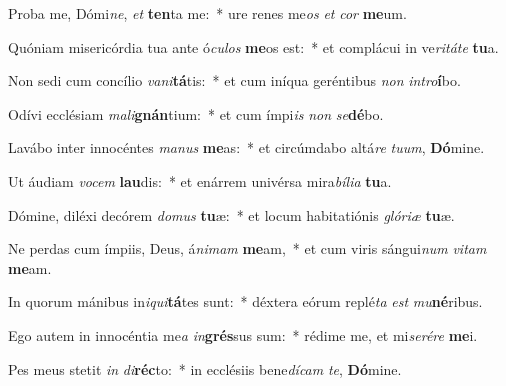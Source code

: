\item Proba me, Dómi\textit{ne}, \textit{et} \textbf{ten}ta me:~* ure renes me\textit{os} \textit{et} \textit{cor} \textbf{me}um.
\item Quóniam misericórdia tua ante ó\textit{cu}\textit{los} \textbf{me}os est:~* et complácui in ve\textit{ri}\textit{tá}\textit{te} \textbf{tu}a.
\item Non sedi cum concílio \textit{va}\textit{ni}\textbf{tá}tis:~* et cum iníqua geréntibus \textit{non} \textit{in}\textit{tro}\textbf{í}bo.
\item Odívi ecclésiam \textit{ma}\textit{li}\textbf{gnán}tium:~* et cum ímpi\textit{is} \textit{non} \textit{se}\textbf{dé}bo.
\item Lavábo inter innocéntes \textit{ma}\textit{nus} \textbf{me}as:~* et circúmdabo altá\textit{re} \textit{tu}\textit{um}, \textbf{Dó}mine.
\item Ut áudiam \textit{vo}\textit{cem} \textbf{lau}dis:~* et enárrem univérsa mira\textit{bí}\textit{li}\textit{a} \textbf{tu}a.
\item Dómine, diléxi decórem \textit{do}\textit{mus} \textbf{tu}æ:~* et locum habitatiónis \textit{gló}\textit{ri}\textit{æ} \textbf{tu}æ.
\item Ne perdas cum ímpiis, Deus, á\textit{ni}\textit{mam} \textbf{me}am,~* et cum viris sángui\textit{num} \textit{vi}\textit{tam} \textbf{me}am.
\item In quorum mánibus in\textit{i}\textit{qui}\textbf{tá}tes sunt:~* déxtera eórum replé\textit{ta} \textit{est} \textit{mu}\textbf{né}ribus.
\item Ego autem in innocéntia me\textit{a} \textit{in}\textbf{grés}sus sum:~* rédime me, et mi\textit{se}\textit{ré}\textit{re} \textbf{me}i.
\item Pes meus stetit \textit{in} \textit{di}\textbf{réc}to:~* in ecclésiis bene\textit{dí}\textit{cam} \textit{te}, \textbf{Dó}mine.
